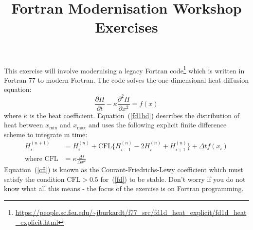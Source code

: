 \documentclass[12pt]{article}
\begin{document}
 
 
 
\title{\bf Fortran Modernisation Workshop \\ Exercises}

 
\maketitle

This exercise will involve modernising a legacy Fortran code\footnote{\url{https://people.sc.fsu.edu/~jburkardt/f77_src/fd1d_heat_explicit/fd1d_heat_explicit.html}} which is written 
in Fortran 77 to modern Fortran. The code solves the one dimensional heat
diffusion equation:
\begin{equation} \label{fd1hd}
\frac{\partial H}{\partial t} - \kappa\frac{\partial^{2} H}{\partial x^{2}} = f(x)
\end{equation}
where $\kappa$ is the heat coefficient. Equation~(\ref{fd1hd}) describes the distribution of heat 
between $x_{\text{min}}$ and $x_{\text{max}}$ and uses the following explicit finite difference 
scheme to integrate in time:
\begin{align}
H^{(n+1)}_{i} & = H^{(n)}_{i} + \text{CFL}\big\{H^{(n)}_{i-1}-2H^{(n)}_{i} +
                      H^{(n)}_{i+1}\big\} + \Delta t f(x_{i}) \label{fd} \\
            \text{where CFL} & = \kappa\frac{\Delta t}{\Delta x^{2}} \label{cfl}
\end{align}
Equation~(\ref{cfl}) is known as the Courant-Friedrichs-Lewy coefficient which must satisfy
the condition $\text{CFL} > 0.5$ for~(\ref{fd}) to be stable. Don't worry if you do 
not know what all this means - the focus of the exercise is on Fortran programming. \\
\end{document}
